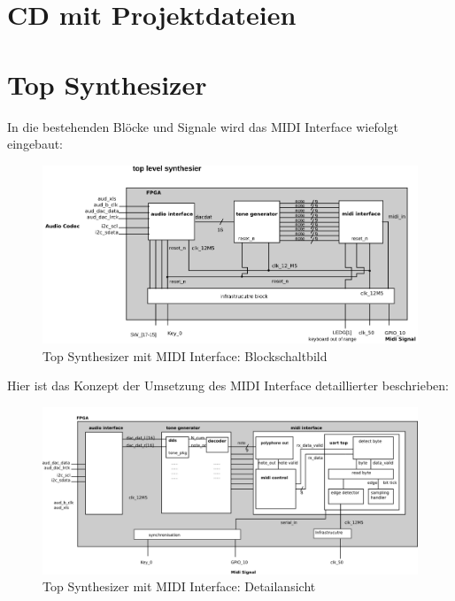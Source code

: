 \chapter{CD mit Projektdateien}\label{sect.anhang_cd}


\chapter{Top Synthesizer}\label{chap.anhang_top_synthesizer}

In die bestehenden Blöcke und Signale wird das MIDI Interface wiefolgt eingebaut:\\
\begin{figure}[H]
	\centering
	\includegraphics[width=1\textwidth]{images/midi_interface/top_synthesizer_block.png}
	\caption{Top Synthesizer mit MIDI Interface: Blockschaltbild}
	\label{fig.top_synthesizer_block}
\end{figure}

Hier ist das Konzept der Umsetzung des MIDI Interface detaillierter beschrieben:\\
\begin{figure}[H]
	\centering
	\includegraphics[width=1\textwidth]{images/midi_interface/top_synthesizer_detail.png}
	\caption{Top Synthesizer mit MIDI Interface: Detailansicht}
	\label{fig.top_synthesizer_detail}
\end{figure}




